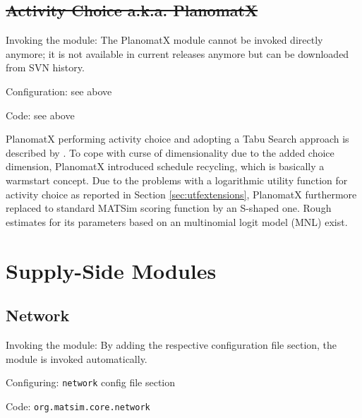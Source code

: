 \subsection{\st{Activity Choice a.k.a. PlanomatX}}
\label{sec:activitychoice}


{\color{lightgray}\tiny

\begin{compactitem}
\item Invoking the module: The PlanomatX module cannot be invoked directly anymore; it is not available in current releases anymore but can be downloaded from SVN history.
\item Configuration: see above
\item Code: see above
\end{compactitem}

PlanomatX performing activity choice and adopting a Tabu Search approach is described by \citet[][]{Feil_PhDThesis_2010}. To cope with curse of dimensionality due to the added choice dimension, PlanomatX introduced schedule recycling, which is basically a warmstart concept. Due to the problems with a logarithmic utility function for activity choice as reported in Section \ref{sec:utfextensions}, PlanomatX furthermore replaced to standard MATSim scoring function by an S-shaped one. Rough estimates for its parameters based on an multinomial logit model (MNL) exist.

}

\section{Supply-Side Modules}
\label{sec:supplysidemodules}

\subsection{Network}
\label{sec:network}
\begin{compactitem}
\item Invoking the module: By adding the respective configuration file section, the module is invoked automatically.
\item Configuring: \lstinline|network| config file section
\item Code: \lstinline|org.matsim.core.network|
\end{compactitem}

